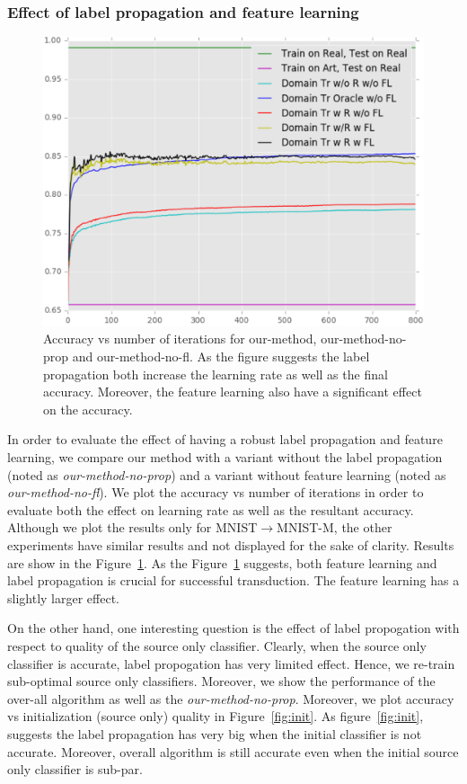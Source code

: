 \subsubsection{Effect of label propagation and feature learning}
\begin{figure}[ht]
\includegraphics[width=\columnwidth]{figure_1fl}
\caption{Accuracy vs number of iterations for our-method, our-method-no-prop and our-method-no-fl. As the figure suggests the label propagation both increase the learning rate as well as the final accuracy. Moreover, the feature learning also have a significant effect on the accuracy.}
\label{fllprop}
\end{figure}
In order to evaluate the effect of having a robust label propagation and feature learning, we compare our method with a variant without the label propagation (noted as \emph{our-method-no-prop}) and a variant without feature learning (noted as \emph{our-method-no-fl}). We plot the accuracy vs number of iterations in order to evaluate both the effect on learning rate as well as the resultant accuracy. Although we plot the results only for MNIST$\rightarrow$MNIST-M, the other experiments have similar results and not displayed for the sake of clarity. Results are show in the Figure~\ref{fllprop}.  As the Figure~\ref{fllprop} suggests, both feature learning and label propagation is crucial for successful transduction. The feature learning has a slightly larger effect.

On the other hand, one interesting question is the effect of label propogation with respect to quality of the source only classifier. Clearly, when the source only classifier is accurate, label propogation has very limited effect. Hence, we re-train sub-optimal source only classifiers. Moreover, we show the performance of the over-all algorithm as well as the \emph{our-method-no-prop}. Moreover, we plot accuracy vs initialization (source only) quality in Figure~\ref{fig:init}. As figure~\ref{fig:init}, suggests the label propagation has very big when the initial classifier is not accurate. Moreover, overall algorithm is still accurate even when the initial source only classifier is sub-par.

